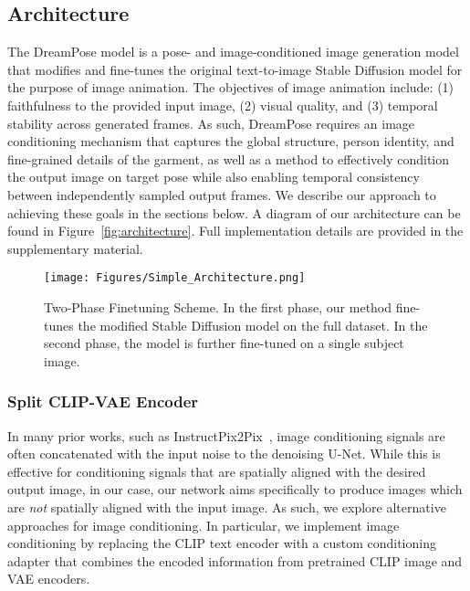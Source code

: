     \subsection{Architecture}
    \label{sec:arch}
        The DreamPose model is a pose- and image-conditioned image generation model that modifies and fine-tunes the original text-to-image Stable Diffusion model for the purpose of image animation. The objectives of image animation include: (1) faithfulness to the provided input image, (2) visual quality, and (3) temporal stability across generated frames. As such, DreamPose requires an image conditioning mechanism that captures the global structure, person identity, and fine-grained details of the garment, as well as a method to effectively condition the output image on target pose while also enabling temporal consistency between independently sampled output frames. We describe our approach to achieving these goals in the sections below. A diagram of our architecture can be found in Figure~\ref{fig:architecture}. Full implementation details are provided in the supplementary material.

        \begin{figure}[h!]
            \begin{center}
                \texttt{[image: Figures/Simple\_Architecture.png]}
            \end{center}
           \caption{Two-Phase Finetuning Scheme. In the first phase, our method fine-tunes the modified Stable Diffusion model on the full dataset. In the second phase, the model is further fine-tuned on a single subject image.}
        \label{fig:finetuning}
        \end{figure}
        
        \subsubsection{Split CLIP-VAE Encoder} In many prior works, such as InstructPix2Pix~\cite{instruct_pix2pix}, image conditioning signals are often concatenated with the input noise to the denoising U-Net. While this is effective for conditioning signals that are spatially aligned with the desired output image, in our case, our network aims specifically to produce images which are \emph{not} spatially aligned with the input image. As such, we explore alternative approaches for image conditioning. In particular, we implement image conditioning by replacing the CLIP text encoder with a custom conditioning adapter that combines the encoded information from pretrained CLIP image and VAE encoders.%

